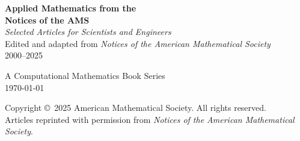 \documentclass[11pt,oneside]{book}
\theoremstyle{definition}
\begin{document}
\frontmatter

\begin{titlepage}
\centering
\vspace*{2cm}

{\Huge\bfseries Applied Mathematics from the\\ Notices of the AMS}\\[1.5cm]

{\Large\itshape Selected Articles for Scientists and Engineers}\\[2cm]

{\large Edited and adapted from \textit{Notices of the American Mathematical Society}\\ 2000--2025}\\[2cm]

\vfill


{\large A Computational Mathematics Book Series}\\[0.5cm]

{\today}

\vspace{2cm}
\end{titlepage}

\newpage
\thispagestyle{empty}
\vspace*{\fill}
\noindent
Copyright \copyright\ 2025 American Mathematical Society. All rights reserved.\\[0.5cm]

Articles reprinted with permission from \textit{Notices of the American Mathematical Society}.\\[0.5cm]
\end{document}
